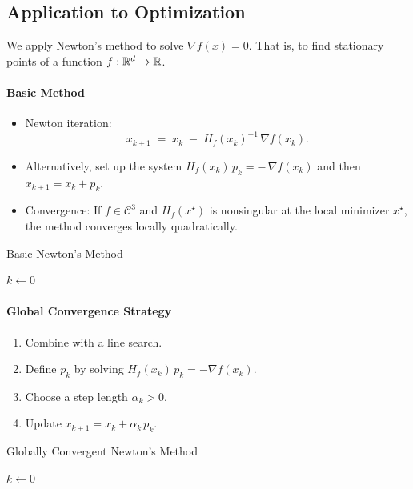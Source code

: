 \subsection*{Application to Optimization}

We apply Newton's method to solve \(\nabla f(x) = 0\). That is, to find stationary points of a function \(f:\mathbb{R}^d \to \mathbb{R}\).

\paragraph{Basic Method}
\begin{itemize}
    \item Newton iteration:
    \[
      x_{k+1} \;=\; x_k \;-\; H_f(x_k)^{-1} \,\nabla f(x_k).
    \]
    \item Alternatively, set up the system \(H_f(x_k)\,p_k = -\,\nabla f(x_k)\) and then \(x_{k+1} = x_k + p_k\).
    \item Convergence: If \(f\in \mathcal{C}^3\) and \(H_f(x^\star)\) is nonsingular at the local minimizer \(x^\star\), the method converges locally quadratically.
\end{itemize}

\begin{algorithm}[H]
\caption{Basic Newton's Method}
\label{alg:newton-basic}
 \(k \gets 0\)\;
\;
\end{algorithm}

\paragraph{Global Convergence Strategy}
\begin{enumerate}
    \item Combine with a line search.
    \item Define \(p_k\) by solving \(H_f(x_k)\,p_k = -\nabla f(x_k)\).
    \item Choose a step length \(\alpha_k > 0\).
    \item Update \(x_{k+1} = x_k + \alpha_k \, p_k\).
\end{enumerate}

\begin{algorithm}[H]
\caption{Globally Convergent Newton's Method}
\label{alg:newton-global}
 \(k \gets 0\)\;
\;
\end{algorithm}

